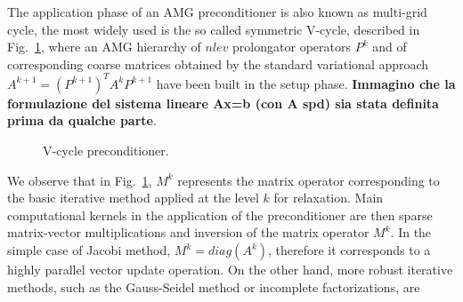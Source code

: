 The application phase of an AMG preconditioner is also known as
multi-grid cycle, the most widely used is the so called symmetric
V-cycle, described in Fig.~\ref{Vcycle}, where an AMG hierarchy of
$nlev$ prolongator operators $P^k$ and of corresponding coarse
matrices obtained by the standard variational approach
$A^{k+1}=(P^{k+1})^TA^kP^{k+1}$ have been built in the setup
phase. \textbf{Immagino che la formulazione del sistema lineare Ax=b
  (con A spd) sia stata definita prima da qualche parte}. 
\begin{figure}[t]
\begin{center}
\caption{V-cycle preconditioner.\label{Vcycle}}
\end{center}
\end{figure}
We observe that in Fig.~\ref{Vcycle}, $M^k$ represents the matrix
operator corresponding to the basic iterative method applied at the
level $k$ for relaxation. 
Main computational kernels in the application of the preconditioner
are then sparse matrix-vector multiplications and inversion of the
matrix operator $M^k$. In the simple case of Jacobi method,
$M^k=diag(A^k)$, therefore it corresponds to a highly parallel vector
update operation. On the other hand, more robust iterative methods,
such as the Gauss-Seidel method or incomplete factorizations, are

